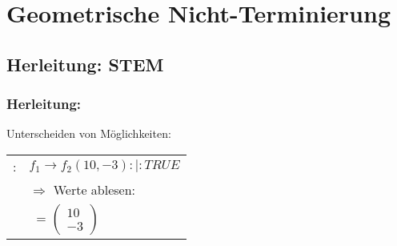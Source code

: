 \section{Geometrische Nicht-Terminierung}

\frame{\tableofcontents[currentsection]}

\subsection{Herleitung: STEM}


\begin{frame}[fragile]
	\frametitle{Herleitung: \stem}
	Unterscheiden von  M\"oglichkeiten:
	\begin{tabular}{rl}
		\blue{konstanter \stem}: & $f_1 \rightarrow f_2(10,-3) :|: TRUE$ \\
							  & $\Rightarrow$ Werte ablesen:  \\
							  & \quad$\>$ \stem = $ \begin{pmatrix} 10 \\ -3 \end{pmatrix}$ \\
								  
	\end{tabular}

\end{frame}

